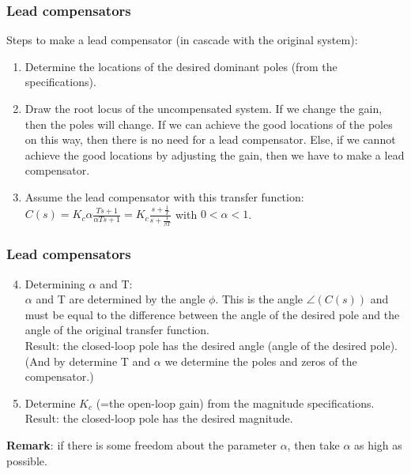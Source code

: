\begin{frame}
	\frametitle{Lead compensators}
	Steps to make a lead compensator (in cascade with the original system):
	\begin{enumerate}
		\item Determine the locations of the desired dominant poles (from the specifications).
		\item Draw the root locus of the uncompensated system. If we change the gain, then the poles will change. If we can achieve the good locations of the poles on this way, then there is no need for a lead compensator. Else, if we cannot achieve the good locations by adjusting the gain, then we have to make a lead compensator. 
		\item Assume the lead compensator with this transfer function: \\
		$C(s)=K_c \alpha\frac{Ts+1}{\alpha Ts+1}= K_c\frac{s+\frac{1}{T}}{s+\frac{1}{\beta T}}$ with $0<\alpha<1$.
	\end{enumerate}
\end{frame}

\begin{frame}
	\frametitle{Lead compensators}
		\begin{enumerate}
			\setcounter{enumi}{3}
			\item Determining $\alpha$ and T:\\
			$\alpha$ and T are determined by the angle $\phi$. This is the angle $\angle(C(s))$ and must be equal to the difference between the angle of the desired pole and the angle of the original transfer function. \\
			Result: the closed-loop pole has the desired angle (angle of the desired pole). (And by determine T and $\alpha$ we determine the poles and zeros of the compensator.)
			\item Determine $K_c$ (=the open-loop gain) from the magnitude specifications.\\
			Result: the closed-loop pole has the desired magnitude. 
		\end{enumerate}
		\textbf{Remark}: if there is some freedom about the parameter $\alpha$, then take $\alpha$ as high as possible. 
\end{frame}

